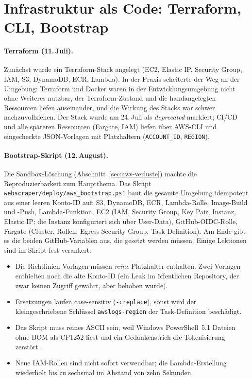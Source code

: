 \section{Infrastruktur als Code: Terraform, CLI, Bootstrap}\label{sec:aws-iac}
\paragraph{Terraform (11.\,Juli).} Zunächst wurde ein Terraform-Stack angelegt (EC2, Elastic IP, Security Group, IAM, S3, DynamoDB, ECR, Lambda). In der Praxis scheiterte der Weg an der Umgebung: Terraform und Docker waren in der Entwicklungsumgebung nicht ohne Weiteres nutzbar, der Terraform-Zustand und die handangelegten Ressourcen liefen auseinander, und die Wirkung des Stacks war schwer nachzuvollziehen. Der Stack wurde am 24.\,Juli als \emph{deprecated} markiert; CI/CD und alle späteren Ressourcen (Fargate, IAM) liefen über AWS-CLI und eingecheckte JSON-Vorlagen mit Platzhaltern (\texttt{ACCOUNT\_ID}, \texttt{REGION}).

\paragraph{Bootstrap-Skript (12.\,August).} Die Sandbox-Löschung (Abschnitt~\ref{sec:aws-verluste}) machte die Reproduzierbarkeit zum Hauptthema. Das Skript \texttt{webscraper/deploy/aws\_bootstrap.ps1} baut die gesamte Umgebung idempotent aus einer leeren Konto-ID auf: S3, DynamoDB, ECR, Lambda-Rolle, Image-Build und -Push, Lambda-Funktion, EC2 (IAM, Security Group, Key Pair, Instanz, Elastic IP; die Instanz konfiguriert sich über User-Data), GitHub-OIDC-Rolle, Fargate (Cluster, Rollen, Egress-Security-Group, Task-Definition). Am Ende gibt es die beiden GitHub-Variablen aus, die gesetzt werden müssen. Einige Lektionen sind im Skript fest verankert:
\begin{itemize}
  \item Die Richtlinien-Vorlagen müssen \emph{reine} Platzhalter enthalten. Zwei Vorlagen enthielten noch die alte Konto-ID (ein Leak im öffentlichen Repository, der zwar keinen Zugriff gewährt, aber behoben wurde).
  \item Ersetzungen laufen case-sensitiv (\texttt{-creplace}), sonst wird der kleingeschriebene Schlüssel \texttt{awslogs-region} der Task-Definition beschädigt.
  \item Das Skript muss reines ASCII sein, weil Windows PowerShell~5.1 Dateien ohne BOM als CP1252 liest und ein Gedankenstrich die Tokenisierung zerstört.
  \item Neue IAM-Rollen sind nicht sofort verwendbar; die Lambda-Erstellung wiederholt bis zu sechsmal im Abstand von zehn Sekunden.
\end{itemize}

